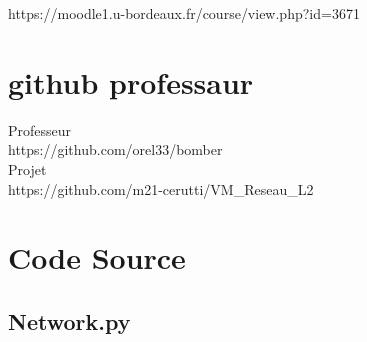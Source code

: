 \documentclass[a4paper]{article}
\begin{document}
https://moodle1.u-bordeaux.fr/course/view.php?id=3671

\section{github professaur} \label{github}

Professeur
\\
https://github.com/orel33/bomber
\\

Projet
\\
https://github.com/m21-cerutti/VM\_Reseau\_L2
\\

\newpage
\section{Code Source}

\subsection{Network.py} \label{network.py}
\end{document}
